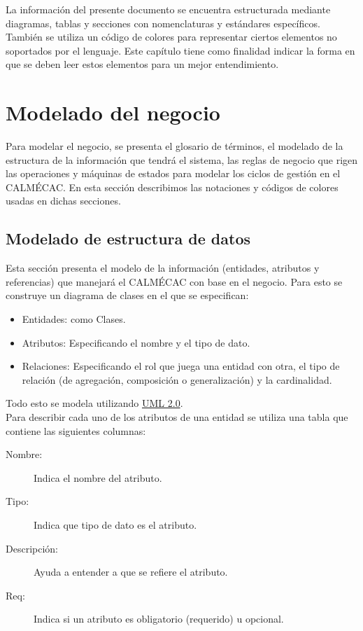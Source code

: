 
	La información del presente documento se encuentra estructurada mediante diagramas, tablas y secciones con nomenclaturas y estándares específicos. También se utiliza un código de colores para representar ciertos elementos no soportados por el lenguaje. Este capítulo tiene como finalidad indicar la forma en que se deben leer estos elementos para un mejor entendimiento.
\section{Modelado del negocio}

	Para modelar el negocio, se presenta el glosario de términos, el modelado de la estructura de la información que tendrá el sistema, las reglas de negocio que rigen las operaciones y máquinas de estados para modelar los ciclos de gestión en el CALMÉCAC. En esta sección describimos las notaciones y códigos de colores usadas en dichas secciones.

\subsection{Modelado de estructura de datos}
\label{sec:ModeladoDatos}

	Esta sección presenta el modelo de la información (entidades, atributos y referencias) que manejará el CALMÉCAC con base en el negocio. Para esto se construye un diagrama de clases en el que se especifican:

\begin{itemize}
	\item Entidades: como Clases.
	\item Atributos: Especificando el nombre y el tipo de dato.
	\item Relaciones: Especificando el rol que juega una entidad con otra, el tipo de relación (de agregación, composición o generalización) y la cardinalidad.
\end{itemize}

Todo esto se modela utilizando \href{http://www.omg.org/spec/UML/2.0/}{UML 2.0}.\\


Para describir  cada uno de los atributos de una entidad se utiliza una tabla que contiene las siguientes columnas:

\begin{description}
	\item[Nombre:] Indica el nombre del atributo.
	\item[Tipo:] Indica que tipo de dato es el atributo.
	\item[Descripción:] Ayuda a entender a que se refiere el atributo.
	\item[Req:]  Indica si un atributo es obligatorio (requerido) u opcional.
\end{description}

